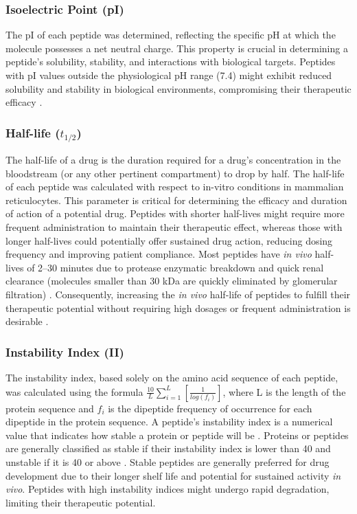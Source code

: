 \subsubsection{Isoelectric Point (pI)}
The pI of each peptide was determined, reflecting the specific pH at which the molecule possesses a net neutral charge. This property is crucial in determining a peptide's solubility, stability, and interactions with biological targets. Peptides with pI values outside the physiological pH range (7.4) might exhibit reduced solubility and stability in biological environments, compromising their therapeutic efficacy \cite{frolov2022pichemist}.

\subsubsection{Half-life ($t_{1/2}$)}
The half-life of a drug is the duration required for a drug's concentration in the bloodstream (or any other pertinent compartment) to drop by half. The half-life of each peptide was calculated with respect to in-vitro conditions in mammalian reticulocytes. This parameter is critical for determining the efficacy and duration of action of a potential drug. Peptides with shorter half-lives might require more frequent administration to maintain their therapeutic effect, whereas those with longer half-lives could potentially offer sustained drug action, reducing dosing frequency and improving patient compliance. Most peptides have \textit{in vivo} half-lives of 2–30 minutes due to protease enzymatic breakdown and quick renal clearance (molecules smaller than 30 kDa are quickly eliminated by glomerular filtration) \cite{penchala2015biomimetic}. Consequently, increasing the \textit{in vivo} half-life of peptides to fulfill their therapeutic potential without requiring high dosages or frequent administration is desirable \cite{penchala2015biomimetic}. 

\subsubsection{Instability Index (II)}
The instability index, based solely on the amino acid sequence of each peptide, was calculated using the formula $\frac{10}{L}\sum_{i=1}^{L} \left[\frac{1}{log(f_i)}\right] $, where L is the length of the protein sequence and $f_i$ is the dipeptide frequency of occurrence for each dipeptide in the protein sequence. A peptide's instability index is a numerical value that indicates how stable a protein or peptide will be \cite{Guruprasad1990}. Proteins or peptides are generally classified as stable if their instability index is lower than 40 and unstable if it is 40 or above \cite{Guruprasad1990}. Stable peptides are generally preferred for drug development due to their longer shelf life and potential for sustained activity \textit{in vivo}. Peptides with high instability indices might undergo rapid degradation, limiting their therapeutic potential.

